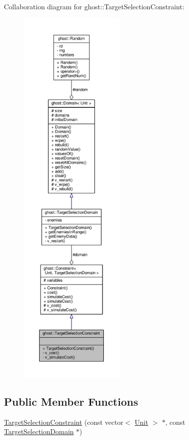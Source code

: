 Collaboration diagram for ghost\-:\-:Target\-Selection\-Constraint\-:
\nopagebreak
\begin{figure}[H]
\begin{center}
\leavevmode
\includegraphics[height=550pt]{classghost_1_1TargetSelectionConstraint__coll__graph}
\end{center}
\end{figure}
\subsection*{Public Member Functions}
\begin{DoxyCompactItemize}
\item 
\hyperlink{classghost_1_1TargetSelectionConstraint_a079d7eb7c7d2bfee8519d2871f676156}{Target\-Selection\-Constraint} (const vector$<$ \hyperlink{classghost_1_1Unit}{Unit} $>$ $\ast$, const \hyperlink{classghost_1_1TargetSelectionDomain}{Target\-Selection\-Domain} $\ast$)
\end{DoxyCompactItemize}
